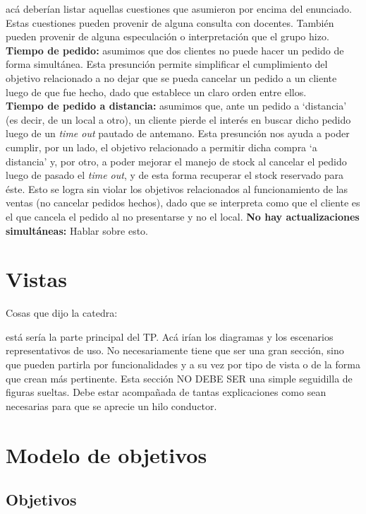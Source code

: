 \documentclass[a4paper,10pt]{article}
\begin{document}
acá deberían listar aquellas cuestiones que asumieron
por encima del enunciado. Estas cuestiones pueden provenir de alguna
consulta con docentes. También pueden provenir de alguna especulación
o interpretación que el grupo hizo.
\noindent
\textbf{Tiempo de pedido:} asumimos que dos clientes no puede hacer un pedido de forma simultánea. Esta presunción permite simplificar el cumplimiento del objetivo relacionado a no dejar que se pueda cancelar un pedido a un cliente luego de que fue hecho, dado que establece un claro orden entre ellos. \\
\textbf{Tiempo de pedido a distancia:} asumimos que, ante un pedido a `distancia' (es decir, de un local a otro), un cliente pierde el interés en buscar dicho pedido luego de un \textit{time out} pautado de antemano. Esta presunción nos ayuda a poder cumplir, por un lado, el objetivo relacionado a permitir dicha compra `a distancia' y, por otro, a poder mejorar el manejo de stock al cancelar el pedido luego de pasado el \textit{time out}, y de esta forma recuperar el stock reservado para éste. Esto se logra sin violar los objetivos relacionados al funcionamiento de las ventas (no cancelar pedidos hechos), dado que se interpreta como que el cliente es el que cancela el pedido al no presentarse y no el local.
\textbf{No hay actualizaciones simultáneas:} Hablar sobre esto.

\section*{Vistas}

Cosas que dijo la catedra:

está sería la parte principal del TP. Acá irían los
diagramas y los escenarios representativos de uso. No necesariamente
tiene que ser una gran sección, sino que pueden partirla por
funcionalidades y a su vez por tipo de vista o de la forma que crean
más pertinente. Esta sección NO DEBE SER una simple seguidilla de
figuras sueltas. Debe estar acompañada de tantas explicaciones como
sean necesarias para que se aprecie un hilo conductor.

\section*{Modelo de objetivos}
\subsection*{Objetivos}
\noindent
\end{document}
